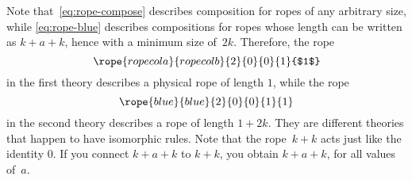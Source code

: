 \begin{solution}
    Note that~\cref{eq:rope-compose} describes composition for ropes of any arbitrary size, while \cref{eq:rope-blue} describes compositions for ropes whose length can be written as $k+a+k$, hence with a minimum size of~$2k$.
    Therefore, the rope
    \begin{equation}
        \rope{ropecola}{ropecolb}{2}{0}{0}{1}{$1$}
    \end{equation}
    in the first theory describes a physical rope of length $1$, while the rope
    \begin{equation}
        \rope{blue}{blue}{2}{0}{0}{1}{1}
    \end{equation}
    in the second theory describes a rope of length $1+2k$.
    They are different theories that happen to have isomorphic rules.
    Note that the rope~$k+k$ acts just like the identity 0.
    If you connect $k + a + k$ to $k+k$, you obtain $k + a + k$, for all values of~$a$.
\end{solution}
%
%
%
%
%
